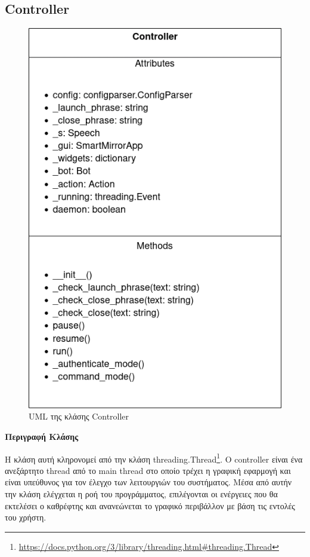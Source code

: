 \subsection{Controller}
\begin{figure}[h!]
    \centering
    \includegraphics[scale=0.7]{images/chapter4/uml_diagrams/Controller.png}
    \caption{UML της κλάσης Controller}
    \label{fig:controller}
\end{figure}
\noindent\textbf{Περιγραφή Κλάσης}

Η κλάση αυτή κληρονομεί από την κλάση threading.Thread\footnote{\href{https://docs.python.org/3/library/threading.html\#threading.Thread}{https://docs.python.org/3/library/threading.html\#threading.Thread}}. O controller είναι ένα ανεξάρτητο thread από το main thread στο οποίο τρέχει η γραφική εφαρμογή και είναι υπεύθυνος για τον έλεγχο των λειτουργιών του συστήματος. Μέσα από αυτήν την κλάση ελέγχεται η ροή του προγράμματος, επιλέγονται οι ενέργειες που θα εκτελέσει ο καθρέφτης και ανανεώνεται το γραφικό περιβάλλον με βάση τις εντολές του χρήστη.

